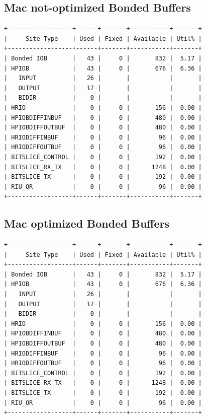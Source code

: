 \documentclass[11pt]{report}
\begin{document}
\subsection*{Mac not-optimized Bonded Buffers}
\small
\begin{lstlisting}
+------------------+------+-------+-----------+-------+
|     Site Type    | Used | Fixed | Available | Util% |
+------------------+------+-------+-----------+-------+
| Bonded IOB       |   43 |     0 |       832 |  5.17 |
| HPIOB            |   43 |     0 |       676 |  6.36 |
|   INPUT          |   26 |       |           |       |
|   OUTPUT         |   17 |       |           |       |
|   BIDIR          |    0 |       |           |       |
| HRIO             |    0 |     0 |       156 |  0.00 |
| HPIOBDIFFINBUF   |    0 |     0 |       480 |  0.00 |
| HPIOBDIFFOUTBUF  |    0 |     0 |       480 |  0.00 |
| HRIODIFFINBUF    |    0 |     0 |        96 |  0.00 |
| HRIODIFFOUTBUF   |    0 |     0 |        96 |  0.00 |
| BITSLICE_CONTROL |    0 |     0 |       192 |  0.00 |
| BITSLICE_RX_TX   |    0 |     0 |      1248 |  0.00 |
| BITSLICE_TX      |    0 |     0 |       192 |  0.00 |
| RIU_OR           |    0 |     0 |        96 |  0.00 |
+------------------+------+-------+-----------+-------+
\end{lstlisting}

\subsection*{Mac optimized Bonded Buffers}
\begin{lstlisting}
+------------------+------+-------+-----------+-------+
|     Site Type    | Used | Fixed | Available | Util% |
+------------------+------+-------+-----------+-------+
| Bonded IOB       |   43 |     0 |       832 |  5.17 |
| HPIOB            |   43 |     0 |       676 |  6.36 |
|   INPUT          |   26 |       |           |       |
|   OUTPUT         |   17 |       |           |       |
|   BIDIR          |    0 |       |           |       |
| HRIO             |    0 |     0 |       156 |  0.00 |
| HPIOBDIFFINBUF   |    0 |     0 |       480 |  0.00 |
| HPIOBDIFFOUTBUF  |    0 |     0 |       480 |  0.00 |
| HRIODIFFINBUF    |    0 |     0 |        96 |  0.00 |
| HRIODIFFOUTBUF   |    0 |     0 |        96 |  0.00 |
| BITSLICE_CONTROL |    0 |     0 |       192 |  0.00 |
| BITSLICE_RX_TX   |    0 |     0 |      1248 |  0.00 |
| BITSLICE_TX      |    0 |     0 |       192 |  0.00 |
| RIU_OR           |    0 |     0 |        96 |  0.00 |
+------------------+------+-------+-----------+-------+
\end{lstlisting}
\newpage
\end{document}
